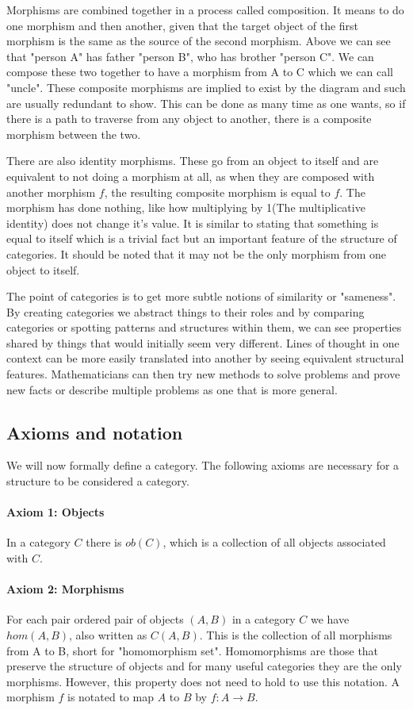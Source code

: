 \documentclass[10pt,a4paper]{amsart}
\begin{document}
Morphisms are combined together in a process called composition.
It means to do one morphism and then another, given that the target object of the first morphism is the same as the source of the second morphism.
Above we can see that "person A" has father "person B", who has brother "person C".
We can compose these two together to have a morphism from A to C which we can call "uncle".
These composite morphisms are implied to exist by the diagram and such are usually redundant to show.
This can be done as many time as one wants, so if there is a path to traverse from any object to another, there is a composite morphism between the two.

There are also identity morphisms.
These go from an object to itself and are equivalent to not doing a morphism at all,
as when they are composed with another morphism $f$, the resulting composite morphism is equal to $f$.
The morphism has done nothing, like how multiplying by 1(The multiplicative identity) does not change it's value.
It is similar to stating that something is equal to itself which is a trivial fact but an important feature of the structure of categories.
It should be noted that it may not be the only morphism from one object to itself.

The point of categories is to get more subtle notions of similarity or "sameness".
By creating categories we abstract things to their roles and by comparing categories or spotting patterns and structures within them,
we can see properties shared by things that would initially seem very different.
Lines of thought in one context can be more easily translated into another by seeing equivalent structural features.
Mathematicians can then try new methods to solve problems and prove new facts or describe multiple problems as one that is more general.
\subsection{Axioms and notation}
We will now formally define a category. The following axioms are necessary for a structure to be considered a category.
\paragraph{Axiom 1: Objects}
In a category $C$ there is $ob(C)$, which is a collection of all objects associated with $C$.
\paragraph{Axiom 2: Morphisms}
For each pair ordered pair of objects $(A,B)$ in a category $C$ we have $hom(A,B)$, also written as $C(A,B)$.
This is the collection of all morphisms from A to B, short for "homomorphism set".
Homomorphisms are those that preserve the structure of objects and for many useful categories they are the only morphisms.
However, this property does not need to hold to use this notation.
A morphism $f$ is notated to map $A$ to $B$ by $f: A\to B$.
\end{document}
